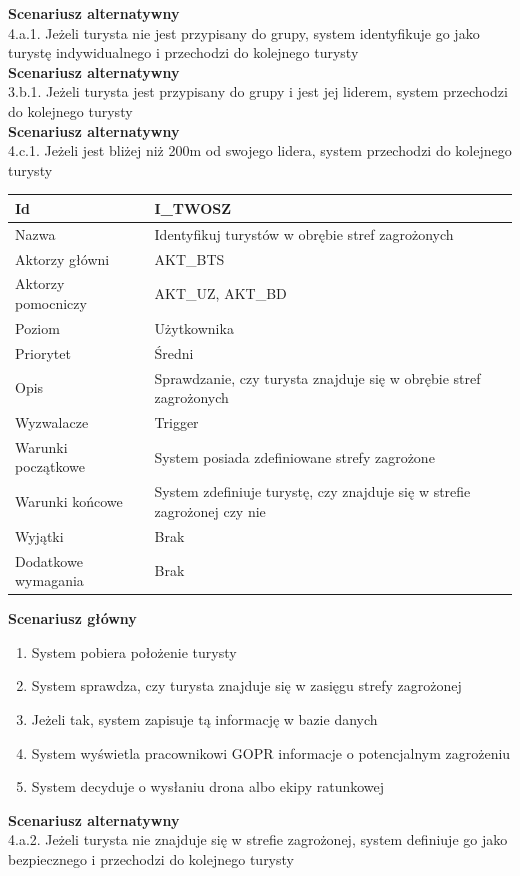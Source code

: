 \documentclass[a4paper,12pt]{article}
\begin{document}
\textbf{Scenariusz alternatywny}\\
4.a.1.	Jeżeli turysta nie jest przypisany do grupy, system identyfikuje go jako turystę indywidualnego i przechodzi do kolejnego turysty\\
\textbf{Scenariusz alternatywny}\\
3.b.1.	Jeżeli turysta jest przypisany do grupy i  jest jej liderem, system przechodzi do kolejnego turysty\\
\textbf{Scenariusz alternatywny}\\
4.c.1.	Jeżeli jest bliżej niż 200m od swojego lidera, system przechodzi do kolejnego turysty
\newpage
\begin{longtable}{| p{5cm} | p{10cm} |}
\hline
Id & I\_TWOSZ \\\hline
Nazwa & Identyfikuj turystów w obrębie stref zagrożonych \\\hline
Aktorzy główni & AKT\_BTS \\\hline
Aktorzy pomocniczy & AKT\_UZ, AKT\_BD \\\hline
Poziom & Użytkownika \\\hline
Priorytet & Średni \\\hline
Opis & Sprawdzanie, czy turysta znajduje się w obrębie stref zagrożonych \\\hline
Wyzwalacze & Trigger \\\hline
Warunki początkowe & System posiada zdefiniowane strefy zagrożone \\\hline
Warunki końcowe & System zdefiniuje turystę, czy znajduje się w strefie zagrożonej czy nie \\\hline
Wyjątki & Brak \\\hline
Dodatkowe wymagania & Brak \\\hline
\end{longtable}
\textbf{Scenariusz główny}
\begin{enumerate}
\item System pobiera położenie turysty
\item System sprawdza, czy turysta znajduje się w zasięgu strefy zagrożonej
\item Jeżeli tak, system zapisuje tą informację w bazie danych
\item System wyświetla pracownikowi GOPR informacje o potencjalnym zagrożeniu
\item System decyduje o wysłaniu drona albo ekipy ratunkowej
\end{enumerate}
\textbf{Scenariusz alternatywny}\\
4.a.2.	Jeżeli turysta nie znajduje się w strefie zagrożonej, system definiuje go jako bezpiecznego i przechodzi do kolejnego turysty
\end{document}
